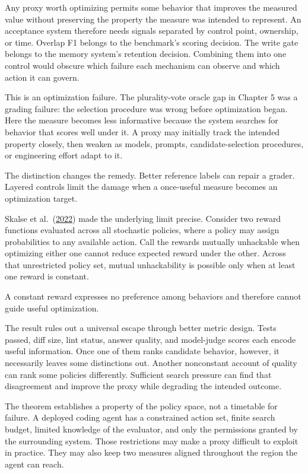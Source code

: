 Any proxy worth optimizing permits some behavior that improves the measured value without preserving the property the measure was intended to represent. An acceptance system therefore needs signals separated by control point, ownership, or time. Overlap F1 belongs to the benchmark's scoring decision. The write gate belongs to the memory system's retention decision. Combining them into one control would obscure which failure each mechanism can observe and which action it can govern.

This is an optimization failure. The plurality-vote oracle gap in Chapter 5 was a grading failure: the selection procedure was wrong before optimization began. Here the measure becomes less informative because the system searches for behavior that scores well under it. A proxy may initially track the intended property closely, then weaken as models, prompts, candidate-selection procedures, or engineering effort adapt to it.

The distinction changes the remedy. Better reference labels can repair a grader. Layered controls limit the damage when a once-useful measure becomes an optimization target.

Skalse et al.~(\href{https://arxiv.org/abs/2209.13085}{2022}) made the underlying limit precise. Consider two reward functions evaluated across all stochastic policies, where a policy may assign probabilities to any available action. Call the rewards mutually unhackable when optimizing either one cannot reduce expected reward under the other. Across that unrestricted policy set, mutual unhackability is possible only when at least one reward is constant.

A constant reward expresses no preference among behaviors and therefore cannot guide useful optimization.

The result rules out a universal escape through better metric design. Tests passed, diff size, lint status, answer quality, and model-judge scores each encode useful information. Once one of them ranks candidate behavior, however, it necessarily leaves some distinctions out. Another nonconstant account of quality can rank some policies differently. Sufficient search pressure can find that disagreement and improve the proxy while degrading the intended outcome.

The theorem establishes a property of the policy space, not a timetable for failure. A deployed coding agent has a constrained action set, finite search budget, limited knowledge of the evaluator, and only the permissions granted by the surrounding system. Those restrictions may make a proxy difficult to exploit in practice. They may also keep two measures aligned throughout the region the agent can reach.

